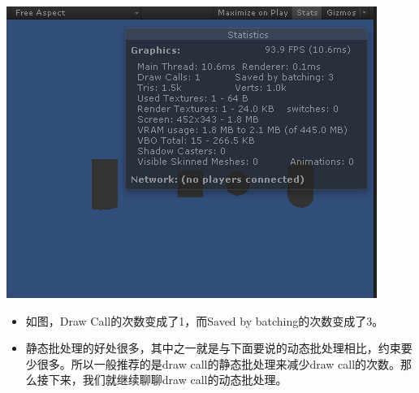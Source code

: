 \documentclass[9pt, b5paper]{article}
\begin{document}
\begin{center}
\includegraphics[width=.9\linewidth]{./pic/batching2.png}
\end{center}
\begin{itemize}
\item 如图，Draw Call的次数变成了1，而Saved by batching的次数变成了3。
\item 静态批处理的好处很多，其中之一就是与下面要说的动态批处理相比，约束要少很多。所以一般推荐的是draw call的静态批处理来减少draw call的次数。那么接下来，我们就继续聊聊draw call的动态批处理。
\end{itemize}
\end{document}
